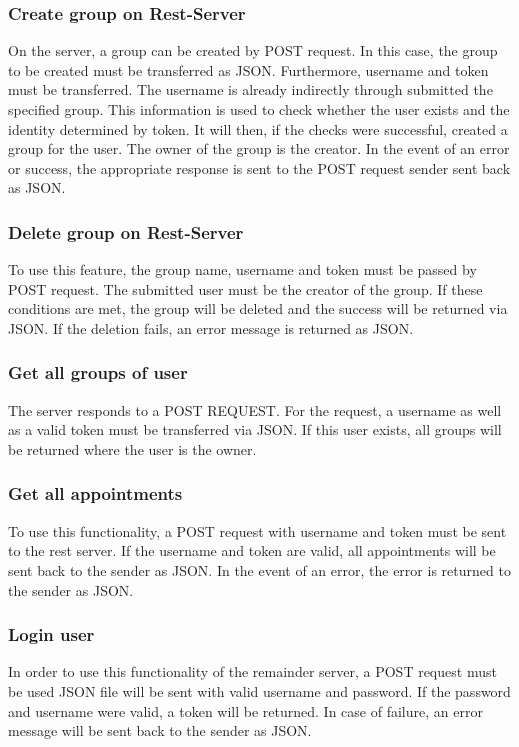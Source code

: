 \documentclass[12pt]{scrartcl}
\begin{document}
    \subsubsection{Create group on Rest-Server}
        On the server, a group can be created by POST request.
        In this case, the group to be created must be transferred as JSON.
        Furthermore, username and token must be transferred. The username is already indirectly through
        submitted the specified group.
        This information is used to check whether the user exists and the identity
        determined by token. It will then, if the checks were successful,
        created a group for the user. The owner of the group is the creator.
        In the event of an error or success, the appropriate response is sent to the POST request sender
        sent back as JSON.

    \subsubsection{Delete group on Rest-Server}
        To use this feature, the group name, username and token must be passed by POST request.
        The submitted user must be the creator of the group.
        If these conditions are met, the group will be deleted and the success will be returned via JSON.
        If the deletion fails, an error message is returned as JSON.


    \subsubsection{Get all groups of user}
        The server responds to a POST REQUEST. For the request, a username as well as a valid token must be transferred via JSON.
        If this user exists, all groups will be returned where the user is the owner.
        
    \subsubsection{Get all appointments}
        To use this functionality, a POST request with username and token must be sent to the rest server.
        If the username and token are valid, all appointments will be sent back to the sender as JSON.
        In the event of an error, the error is returned to the sender as JSON.
    
    \subsubsection{Login user}      
        In order to use this functionality of the remainder server, a POST request must be used
        JSON file will be sent with valid username and password.
        If the password and username were valid, a token will be returned.
        In case of failure, an error message will be sent back to the sender as JSON.
\end{document}
